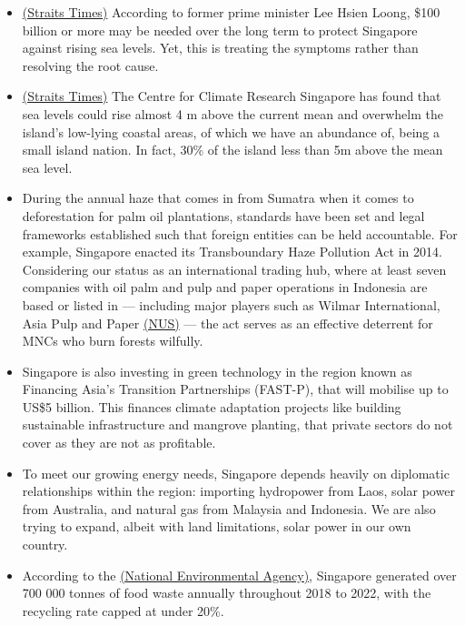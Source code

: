\documentclass[oneside]{book}
\begin{document}
\begin{enumerate}
\begin{itemize}
\begin{itemize}
            \item \href{https://www.straitstimes.com/singapore/national-day-rally-2019-100-billion-needed-to-protect-singapore-against-rising-sea-levels}{(Straits Times)} According to former prime minister Lee Hsien Loong, \$100 billion or more may be needed over the long term to protect Singapore against rising sea levels. Yet, this is treating the symptoms rather than resolving the root cause.
            \item \href{https://www.straitstimes.com/singapore/national-day-rally-2019-100-billion-needed-to-protect-singapore-against-rising-sea-levels}{(Straits Times)} The Centre for Climate Research Singapore has found that sea levels could rise almost 4 m above the current mean and overwhelm the island's low-lying coastal areas, of which we have an abundance of, being a small island nation. In fact, 30\% of the island less than 5m above the mean sea level.
            \item During the annual haze that comes
            in from Sumatra when it comes to deforestation for palm oil plantations, standards have been set and legal frameworks established such that foreign entities can be held accountable. For example, Singapore enacted its Transboundary Haze Pollution Act in 2014. Considering our status as an international trading hub, where at least seven companies with oil palm and pulp and paper operations in Indonesia are based or listed in --- including major players such as Wilmar International, Asia Pulp and Paper \href{https://law.nus.edu.sg/wp-content/uploads/2020/04/002_2015_Alan-Khee-Jin-Tan.pdf}{(NUS)} --- the act serves as an effective deterrent for MNCs who burn forests wilfully.
            \item Singapore is also investing in green technology in the region known as
            Financing Asia's Transition Partnerships (FAST-P), that will mobilise up to US\$5 billion. This finances climate adaptation projects like building sustainable infrastructure and mangrove planting, that private sectors do not cover as they are not as profitable.
            \item To meet our growing energy needs, Singapore depends heavily on diplomatic relationships within
            the region: importing hydropower from Laos, solar power from Australia, and natural gas from Malaysia and Indonesia. We are also trying to expand, albeit with land limitations, solar power in our own country.
            \item According to the \href{https://www.nea.gov.sg/our-services/waste-management/3r-programmes-and-resources/food-waste-management}{(National Environmental Agency)}, Singapore generated over 700 000 tonnes of food waste annually throughout 2018 to 2022, with the recycling rate capped at under 20\%.

\end{itemize}
\end{itemize}
\end{enumerate}
\end{document}
